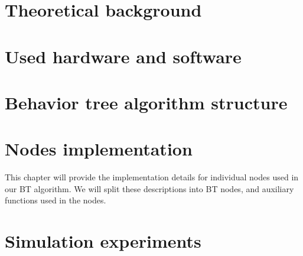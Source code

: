 \documentclass{ctuthesis}
\begin{document}
    \maketitle

    

    \chapter{Theoretical background}
        
        
        
        

    \chapter{Used hardware and software}
        
        
                

    \chapter{Behavior tree algorithm structure}
        

    \chapter{Nodes implementation}
        This chapter will provide the implementation details for individual nodes used in our BT algorithm. We will split these descriptions into BT nodes, and auxiliary functions used in the nodes.
        
        
        
        
    \chapter{Simulation experiments}
        




    \printbibliography
\end{document}
